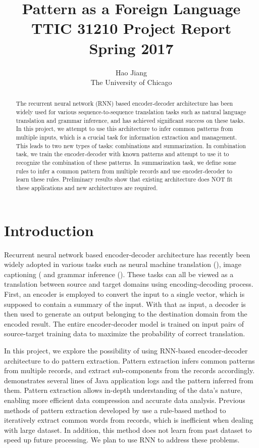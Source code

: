 \documentclass{article}
\title{\LARGE{Pattern as a Foreign Language} \\ \large{TTIC 31210 Project Report \\ Spring 2017}}
\author{Hao Jiang \\ The University of Chicago}
\begin{document}
\maketitle

\begin{abstract}
The recurrent neural network (RNN) based encoder-decoder architecture has been widely used for various sequence-to-sequence translation tasks such as natural language translation and grammar inference, and has achieved significant success on these tasks. In this project, we attempt to use this architecture to infer common patterns from multiple inputs, which is a crucial task for information extraction and management. This leads to two new types of tasks: combinations and summarization. In combination task, we train the encoder-decoder with known patterns and attempt to use it to recognize the combination of these patterns. In summarization task, we define some rules to infer a common pattern from multiple records and use encoder-decoder to learn these rules. Preliminary results show that existing architecture does NOT fit these applications and new architectures are required.
\end{abstract}

\section{Introduction}
Recurrent neural network based encoder-decoder architecture has recently been widely adopted in various tasks such as neural machine translation (\cite{ntran_2013, ntran_2014}), image captioning (\cite{icap_2015} and grammar inference (\cite{grammar_2014}). These tasks can all be viewed as a translation between source and target domains using encoding-decoding process. First, an encoder is employed to convert the input to a single vector, which is supposed to contain a summary of the input. With that as input, a decoder is then used to generate an output belonging to the destination domain from the encoded result. The entire encoder-decoder model is trained on input pairs of source-target training data to maximize the probability of correct translation.

In this project, we explore the possibility of using RNN-based encoder-decoder architecture to do pattern extraction. Pattern extraction infers common patterns from multiple records, and extract sub-components from the records accordingly.  demonstrates several lines of Java application logs and the pattern inferred from them. Pattern extraction allows in-depth understanding of the data's nature, enabling more efficient data compression and accurate data analysis. Previous methods of pattern extraction developed by \cite{dirt_2008} use a rule-based method to iteratively extract common words from records, which is inefficient when dealing with large dataset. In addition, this method does not learn from past dataset to speed up future processing. We plan to use RNN to address these problems.
\end{document}
